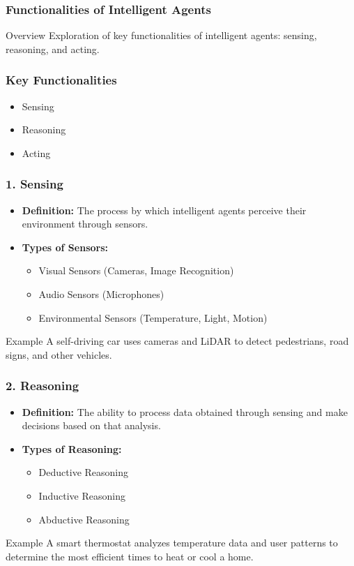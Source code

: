 \documentclass[aspectratio=169]{beamer}
\begin{document}
\begin{frame}[fragile]
    \frametitle{Functionalities of Intelligent Agents}
    \begin{block}{Overview}
        Exploration of key functionalities of intelligent agents: sensing, reasoning, and acting.
    \end{block}
\end{frame}

\begin{frame}[fragile]
    \frametitle{Key Functionalities}
    \begin{itemize}
        \item Sensing
        \item Reasoning
        \item Acting
    \end{itemize}
\end{frame}

\begin{frame}[fragile]
    \frametitle{1. Sensing}
    \begin{itemize}
        \item \textbf{Definition:} The process by which intelligent agents perceive their environment through sensors.
        \item \textbf{Types of Sensors:}
        \begin{itemize}
            \item Visual Sensors (Cameras, Image Recognition)
            \item Audio Sensors (Microphones)
            \item Environmental Sensors (Temperature, Light, Motion)
        \end{itemize}
    \end{itemize}
    \begin{block}{Example}
        A self-driving car uses cameras and LiDAR to detect pedestrians, road signs, and other vehicles.
    \end{block}
\end{frame}

\begin{frame}[fragile]
    \frametitle{2. Reasoning}
    \begin{itemize}
        \item \textbf{Definition:} The ability to process data obtained through sensing and make decisions based on that analysis.
        \item \textbf{Types of Reasoning:}
        \begin{itemize}
            \item Deductive Reasoning
            \item Inductive Reasoning
            \item Abductive Reasoning
        \end{itemize}
    \end{itemize}
    \begin{block}{Example}
        A smart thermostat analyzes temperature data and user patterns to determine the most efficient times to heat or cool a home.
    \end{block}
\end{frame}
\end{document}
